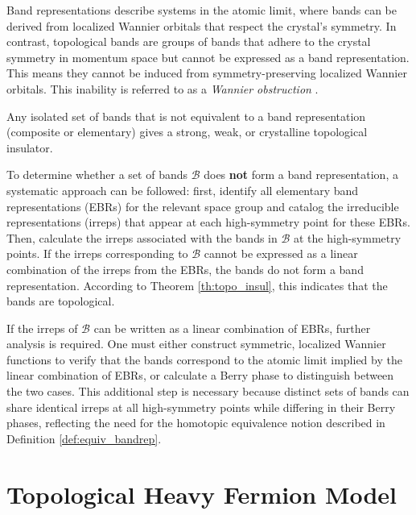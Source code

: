 \documentclass[12pt]{report}
\begin{document}
Band representations describe systems in the atomic limit, where bands can be derived from localized Wannier orbitals that respect the crystal's symmetry. In contrast, topological bands are groups of bands that adhere to the crystal symmetry in momentum space but cannot be expressed as a band representation. This means they cannot be induced from symmetry-preserving localized Wannier orbitals. This inability is referred to as a \textit{Wannier obstruction} \cite{FragileTopology_Po2018, building_blocks2018}.

\begin{theorem} \label{th:topo_insul}
Any isolated set of bands that is not equivalent to a band representation (composite or elementary) gives a strong, weak, or crystalline topological insulator.
\end{theorem}


To determine whether a set of bands \(\mathcal{B}\) does \textbf{not} form a band representation, a systematic approach can be followed: first, identify all elementary band representations (EBRs) for the relevant space group and catalog the irreducible representations (irreps) that appear at each high-symmetry point for these EBRs. Then, calculate the irreps associated with the bands in \(\mathcal{B}\) at the high-symmetry points. If the irreps corresponding to \(\mathcal{B}\) cannot be expressed as a linear combination of the irreps from the EBRs, the bands do not form a band representation. According to Theorem \ref{th:topo_insul}, this indicates that the bands are topological.

If the irreps of \(\mathcal{B}\) can be written as a linear combination of EBRs, further analysis is required. One must either construct symmetric, localized Wannier functions to verify that the bands correspond to the atomic limit implied by the linear combination of EBRs, or calculate a Berry phase to distinguish between the two cases. This additional step is necessary because distinct sets of bands can share identical irreps at all high-symmetry points while differing in their Berry phases, reflecting the need for the homotopic equivalence notion described in Definition \ref{def:equiv_bandrep}.



\section{Topological Heavy Fermion Model} \label{sec:topo_heavy_fermion}
\end{document}
